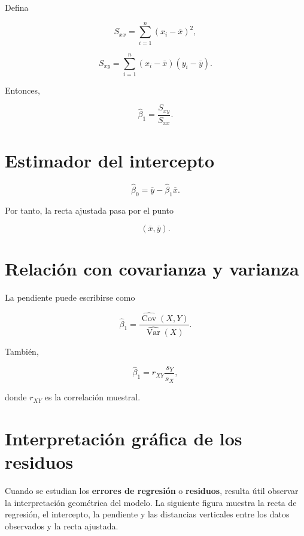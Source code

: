 \documentclass[
  spanish,
  10.5pt,
  letterpaper,
  DIV=11,
  numbers=noendperiod,
  oneside,
  open=any]{scrreprt}
\theoremstyle{definition}
\theoremstyle{definition}
\theoremstyle{plain}
\theoremstyle{remark}
\begin{document}

Defina

\[
S_{xx}
=
\sum_{i=1}^{n}
(x_i-\overline{x})^2,
\]

\[
S_{xy}
=
\sum_{i=1}^{n}
(x_i-\overline{x})(y_i-\overline{y}).
\]

Entonces,

\[
\widehat{\beta}_1
=
\frac{S_{xy}}{S_{xx}}.
\]

\section*{Estimador del intercepto}\label{estimador-del-intercepto}


\[
\widehat{\beta}_0
=
\overline{y}
-
\widehat{\beta}_1\overline{x}.
\]

Por tanto, la recta ajustada pasa por el punto

\[
(\overline{x},\overline{y}).
\]

\section*{Relación con covarianza y
varianza}\label{relaciuxf3n-con-covarianza-y-varianza}


La pendiente puede escribirse como

\[
\widehat{\beta}_1
=
\frac{
\widehat{\operatorname{Cov}}(X,Y)
}{
\widehat{\operatorname{Var}}(X)
}.
\]

También,

\[
\widehat{\beta}_1
=
r_{XY}
\frac{s_Y}{s_X},
\]

donde \(r_{XY}\) es la correlación muestral.

\section*{Interpretación gráfica de los
residuos}\label{interpretaciuxf3n-gruxe1fica-de-los-residuos}


Cuando se estudian los \textbf{errores de regresión} o
\textbf{residuos}, resulta útil observar la interpretación geométrica
del modelo. La siguiente figura muestra la recta de regresión, el
intercepto, la pendiente y las distancias verticales entre los datos
observados y la recta ajustada.
\end{document}
